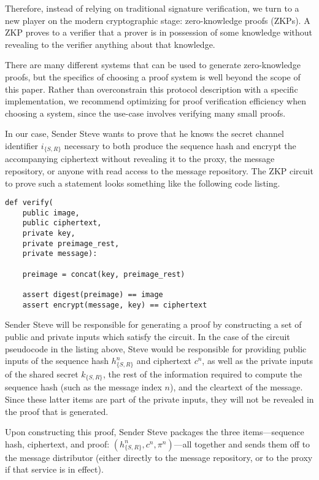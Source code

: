 Therefore, instead of relying on traditional signature verification, we turn to a new player on the modern cryptographic stage: zero-knowledge proofs (ZKPs). A ZKP proves to a verifier that a prover is in possession of some knowledge without revealing to the verifier anything about that knowledge. \parencite{goldwasser_knowledge_1985}

There are many different systems that can be used to generate zero-knowledge proofs, but the specifics of choosing a proof system is well beyond the scope of this paper. Rather than overconstrain this protocol description with a specific implementation, we recommend optimizing for proof verification efficiency when choosing a system, since the use-case involves verifying many small proofs.

In our case, Sender Steve wants to prove that he knows the secret channel identifier $i_{\{S,R\}}$ necessary to both produce the sequence hash and encrypt the accompanying ciphertext without revealing it to the proxy, the message repository, or anyone with read access to the message repository. The ZKP circuit to prove such a statement looks something like the following code listing.

\begin{verbatim}
def verify(
    public image,
    public ciphertext,
    private key,
    private preimage_rest,
    private message):

    preimage = concat(key, preimage_rest)

    assert digest(preimage) == image
    assert encrypt(message, key) == ciphertext
\end{verbatim}

Sender Steve will be responsible for generating a proof by constructing a set of public and private inputs which satisfy the circuit. In the case of the circuit pseudocode in the listing above, Steve would be responsible for providing public inputs of the sequence hash $h_{\{S,R\}}^n$ and ciphertext $c^n$, as well as the private inputs of the shared secret $k_{\{S,R\}}$, the rest of the information required to compute the sequence hash (such as the message index $n$), and the cleartext of the message. Since these latter items are part of the private inputs, they will not be revealed in the proof that is generated.

Upon constructing this proof, Sender Steve packages the three items---sequence hash, ciphertext, and proof: $(h_{\{S,R\}}^n, c^n, \pi^n)$---all together and sends them off to the message distributor (either directly to the message repository, or to the proxy if that service is in effect).

